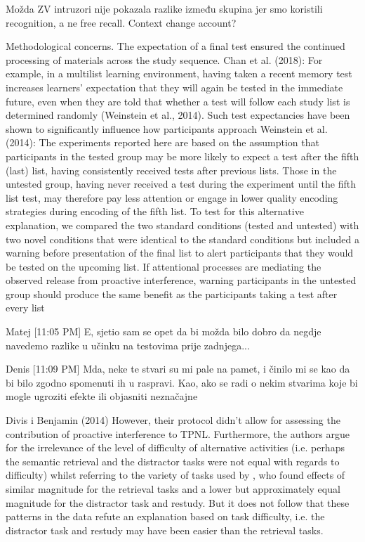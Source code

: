 \documentclass[../main.tex]{subfiles}
\begin{document}
Možda ZV intruzori nije pokazala razlike između skupina jer smo koristili 
recognition, a ne free recall.
Context change account?






Methodological concerns. The expectation of a final test ensured the
continued processing of materials across the study sequence.
Chan et al. (2018): %
For example, in a multilist learning environment, having taken a
recent memory test increases learners’ expectation that they will
again be tested in the immediate future, even when they are told
that whether a test will follow each study list is determined
randomly (Weinstein et al., 2014). Such test expectancies have
been shown to significantly influence how participants approach
Weinstein et al. (2014):
The experiments reported here are based on the assumption that
participants in the tested group may be more likely to expect a test
after the fifth (last) list, having consistently received tests after
previous lists. Those in the untested group, having never received
a test during the experiment until the fifth list test, may therefore
pay less attention or engage in lower quality encoding strategies
during encoding of the fifth list. To test for this alternative explanation, 
we compared the two standard conditions (tested and
untested) with two novel conditions that were identical to the
standard conditions but included a warning before presentation of
the final list to alert participants that they would be tested on the
upcoming list. If attentional processes are mediating the observed
release from proactive interference, warning participants in the
untested group should produce the same benefit as the participants
taking a test after every list


Matej [11:05 PM]
E, sjetio sam se opet da bi možda bilo dobro da negdje navedemo razlike u učinku na testovima prije zadnjega...

Denis [11:09 PM]
Mda, neke te stvari su mi pale na pamet, i činilo mi se kao da bi bilo zgodno spomenuti ih u raspravi. Kao, ako se radi o nekim stvarima koje bi mogle ugroziti efekte ili objasniti neznačajne









Divis i Benjamin (2014)
However, their protocol didn't allow for assessing the contribution of proactive interference to TPNL. Furthermore, the authors argue for the irrelevance of the level of difficulty of alternative activities (i.e. perhaps the semantic retrieval and the distractor tasks were not equal with regards to difficulty) whilst referring to the variety of tasks used by \cite{pastotterRetrievalLearningFacilitates2011}, who found effects of similar magnitude for the retrieval tasks and a lower but approximately equal magnitude for the distractor task and restudy. But it does not follow that these patterns in the data refute an explanation based on task difficulty, i.e. the distractor task and restudy may have been easier than the retrieval tasks. 
\end{document}
